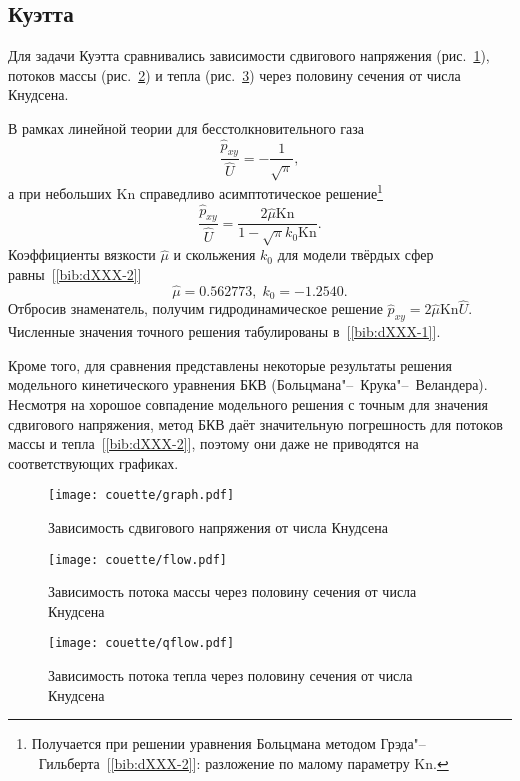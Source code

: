 \documentclass[english,russian,a4paper,12pt]{article}
\newcommand{\Kn}{\mathrm{Kn}}
\begin{document}
\section*{}

\subsection*{ Куэтта}

Для задачи Куэтта сравнивались зависимости сдвигового напряжения (рис.~\ref{fig:couette:shear}),
потоков массы (рис.~\ref{fig:couette:flow}) и тепла (рис.~\ref{fig:couette:qflow})
через половину сечения от числа Кнудсена.

В рамках линейной теории для бесстолкновительного газа
\[ \frac{\hat{p}_{xy}}{\hat{U}} = -\frac1{\sqrt{\pi}}, \]
а при небольших \(\Kn\) справедливо асимптотическое решение\footnote
{ Получается при решении уравнения Больцмана методом Грэда"--~Гильберта~[\ref{bib:dXXX-2}]: разложение по малому параметру \(\Kn\). }
\[ \frac{\hat{p}_{xy}}{\hat{U}} = \frac{2\hat{\mu}\Kn}{1-\sqrt{\pi}k_0\Kn}. \]
Коэффициенты вязкости \(\hat{\mu}\) и скольжения \(k_0\) для модели твёрдых сфер равны~[\ref{bib:dXXX-2}]
\[ \hat{\mu} = 0.562773, \; k_0 = -1.2540. \]
Отбросив знаменатель, получим гидродинамическое решение \(\hat{p}_{xy} = 2\hat{\mu}\Kn\hat{U}\).
Численные значения точного решения табулированы в~[\ref{bib:dXXX-1}].

Кроме того, для сравнения представлены некоторые результаты 
решения модельного кинетического уравнения БКВ (Больцмана"--~Крука"--~Веландера).
Несмотря на хорошое совпадение модельного решения с точным для значения сдвигового напряжения,
метод БКВ даёт значительную погрешность для потоков массы и тепла~[\ref{bib:dXXX-2}],
поэтому они даже не приводятся на соответствующих графиках.

\begin{figure}
	\centering
	\texttt{[image: couette/graph.pdf]}
	\caption{Зависимость сдвигового напряжения от числа Кнудсена}\label{fig:couette:shear}
\end{figure}

\begin{figure}
	\centering
	\texttt{[image: couette/flow.pdf]}
	\caption{Зависимость потока массы через половину сечения от числа Кнудсена}\label{fig:couette:flow}
\end{figure}

\begin{figure}
	\centering
	\texttt{[image: couette/qflow.pdf]}
	\caption{Зависимость потока тепла через половину сечения от числа Кнудсена}\label{fig:couette:qflow}
\end{figure}
\end{document}
